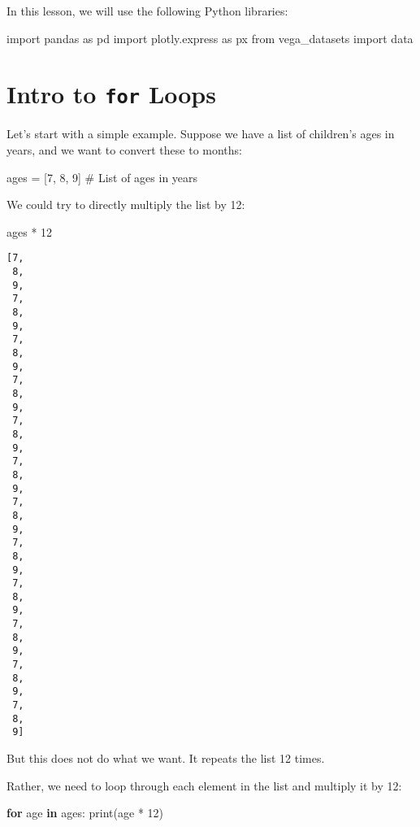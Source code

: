 \documentclass[
  letterpaper,
  DIV=11,
  numbers=noendperiod]{scrreprt}
\newenvironment{Shaded}{\begin{snugshade}}{\end{snugshade}}
\newcommand{\BuiltInTok}[1]{\textcolor[rgb]{0.00,0.23,0.31}{#1}}
\newcommand{\CommentTok}[1]{\textcolor[rgb]{0.37,0.37,0.37}{#1}}
\newcommand{\ControlFlowTok}[1]{\textcolor[rgb]{0.00,0.23,0.31}{\textbf{#1}}}
\newcommand{\DecValTok}[1]{\textcolor[rgb]{0.68,0.00,0.00}{#1}}
\newcommand{\ImportTok}[1]{\textcolor[rgb]{0.00,0.46,0.62}{#1}}
\newcommand{\KeywordTok}[1]{\textcolor[rgb]{0.00,0.23,0.31}{\textbf{#1}}}
\newcommand{\NormalTok}[1]{\textcolor[rgb]{0.00,0.23,0.31}{#1}}
\newcommand{\OperatorTok}[1]{\textcolor[rgb]{0.37,0.37,0.37}{#1}}
\begin{document}
In this lesson, we will use the following Python libraries:

\begin{Shaded}
\begin{Highlighting}[]
\ImportTok{import}\NormalTok{ pandas }\ImportTok{as}\NormalTok{ pd}
\ImportTok{import}\NormalTok{ plotly.express }\ImportTok{as}\NormalTok{ px}
\ImportTok{from}\NormalTok{ vega\_datasets }\ImportTok{import}\NormalTok{ data}
\end{Highlighting}
\end{Shaded}

\section{\texorpdfstring{Intro to \texttt{for}
Loops}{Intro to for Loops}}\label{intro-to-for-loops}

Let's start with a simple example. Suppose we have a list of children's
ages in years, and we want to convert these to months:

\begin{Shaded}
\begin{Highlighting}[]
\NormalTok{ages }\OperatorTok{=}\NormalTok{ [}\DecValTok{7}\NormalTok{, }\DecValTok{8}\NormalTok{, }\DecValTok{9}\NormalTok{]  }\CommentTok{\# List of ages in years}
\end{Highlighting}
\end{Shaded}

We could try to directly multiply the list by 12:

\begin{Shaded}
\begin{Highlighting}[]
\NormalTok{ages }\OperatorTok{*} \DecValTok{12}
\end{Highlighting}
\end{Shaded}

\begin{verbatim}
[7,
 8,
 9,
 7,
 8,
 9,
 7,
 8,
 9,
 7,
 8,
 9,
 7,
 8,
 9,
 7,
 8,
 9,
 7,
 8,
 9,
 7,
 8,
 9,
 7,
 8,
 9,
 7,
 8,
 9,
 7,
 8,
 9,
 7,
 8,
 9]
\end{verbatim}

But this does not do what we want. It repeats the list 12 times.

Rather, we need to loop through each element in the list and multiply it
by 12:

\begin{Shaded}
\begin{Highlighting}[]
\ControlFlowTok{for}\NormalTok{ age }\KeywordTok{in}\NormalTok{ ages:}
    \BuiltInTok{print}\NormalTok{(age }\OperatorTok{*} \DecValTok{12}\NormalTok{)}
\end{Highlighting}
\end{Shaded}
\end{document}
